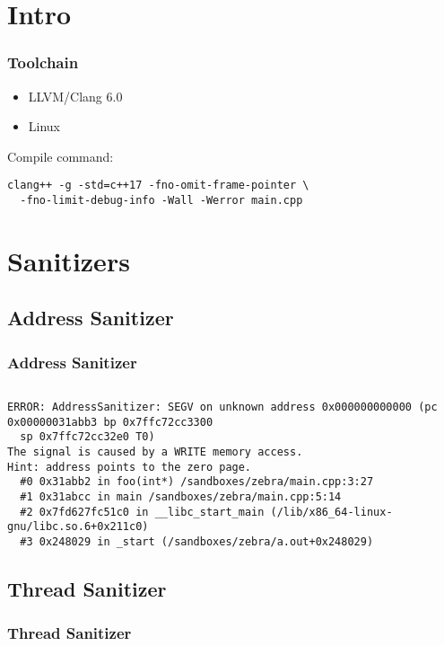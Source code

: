 \section{Intro}

\begin{frame}[fragile]
\frametitle{Toolchain}
\begin{itemize}
  \item LLVM/Clang 6.0
  \item Linux
\end{itemize}
Compile command:
  \begin{Verbatim}
clang++ -g -std=c++17 -fno-omit-frame-pointer \
  -fno-limit-debug-info -Wall -Werror main.cpp
  \end{Verbatim}
\end{frame}

\section{Sanitizers}
\subsection{Address Sanitizer}
\begin{frame}[fragile]
  \frametitle{Address Sanitizer}
  \inputminted[fontsize=\small,linenos]{cpp}{snippets/address.cpp}
\pause
  \begin{Verbatim}[fontsize=\tiny]
ERROR: AddressSanitizer: SEGV on unknown address 0x000000000000 (pc 0x00000031abb3 bp 0x7ffc72cc3300
  sp 0x7ffc72cc32e0 T0)
The signal is caused by a WRITE memory access.
Hint: address points to the zero page.
  #0 0x31abb2 in foo(int*) /sandboxes/zebra/main.cpp:3:27
  #1 0x31abcc in main /sandboxes/zebra/main.cpp:5:14
  #2 0x7fd627fc51c0 in __libc_start_main (/lib/x86_64-linux-gnu/libc.so.6+0x211c0)
  #3 0x248029 in _start (/sandboxes/zebra/a.out+0x248029)
\end{Verbatim}
\end{frame}

\subsection{Thread Sanitizer}
\begin{frame}[fragile]
\frametitle{Thread Sanitizer}
  \inputminted[fontsize=\scriptsize,linenos]{cpp}{snippets/thread.cpp}
\end{frame}

